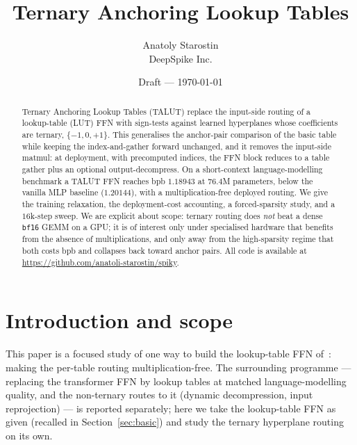 \documentclass[11pt]{article}
\title{\vspace{-1.2cm}\textbf{Ternary Anchoring Lookup Tables}}
\author{Anatoly Starostin \\ DeepSpike Inc.}
\date{Draft --- \today}
\begin{document}
\maketitle
\vspace{-0.8cm}

\begin{abstract}
\noindent Ternary Anchoring Lookup Tables (TALUT) replace the input-side routing of a
lookup-table (LUT) FFN with sign-tests against learned hyperplanes whose coefficients are
ternary, $\{-1,0,+1\}$. This generalises the anchor-pair comparison of the basic table while
keeping the index-and-gather forward unchanged, and it removes the input-side matmul: at
deployment, with precomputed indices, the FFN block reduces to a table gather plus an optional
output-decompress. On a short-context language-modelling benchmark a TALUT FFN reaches bpb
$1.18943$ at $76.4$M parameters, below the vanilla MLP baseline ($1.20144$), with a
multiplication-free deployed routing. We give the training relaxation, the deployment-cost
accounting, a forced-sparsity study, and a $16$k-step sweep. We are explicit about scope: ternary
routing does \emph{not} beat a dense \texttt{bf16} GEMM on a GPU; it is of interest only under
specialised hardware that benefits from the absence of multiplications, and only away from the
high-sparsity regime that both costs bpb and collapses back toward anchor pairs. All code is
available at \url{https://github.com/anatoli-starostin/spiky}.
\end{abstract}

\section{Introduction and scope}
\label{sec:intro}
This paper is a focused study of one way to build the lookup-table FFN of~\cite{manifesto}: making
the per-table routing multiplication-free. The surrounding programme --- replacing the transformer
FFN by lookup tables at matched language-modelling quality, and the non-ternary routes to it
(dynamic decompression, input reprojection) --- is reported separately; here we take the
lookup-table FFN as given (recalled in Section~\ref{sec:basic}) and study the ternary hyperplane
routing on its own.
\end{document}
